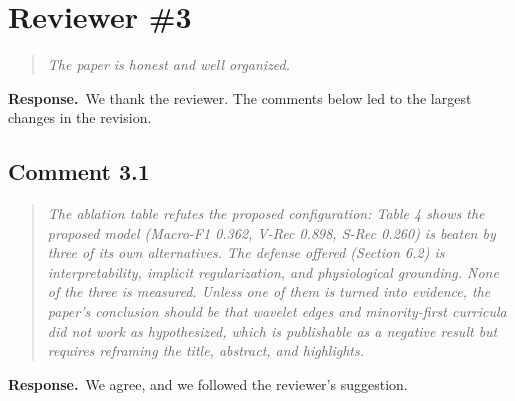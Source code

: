 \documentclass[11pt]{article}
\newenvironment{reviewer}{\begin{quote}\itshape\color{revcol}}{\end{quote}}
\newcommand{\resp}{\textbf{Response.}~}
\begin{document}
\section*{Reviewer \#3}

\begin{reviewer}
The paper is honest and well organized.
\end{reviewer}
\resp We thank the reviewer. The comments below led to the largest changes in the revision.

\subsection*{Comment 3.1}
\begin{reviewer}
The ablation table refutes the proposed configuration: Table 4 shows the proposed model (Macro-F1 0.362, V-Rec 0.898, S-Rec 0.260) is beaten by three of its own alternatives. The defense offered (Section 6.2) is interpretability, implicit regularization, and physiological grounding. None of the three is measured. Unless one of them is turned into evidence, the paper's conclusion should be that wavelet edges and minority-first curricula did not work as hypothesized, which is publishable as a negative result but requires reframing the title, abstract, and highlights.
\end{reviewer}
\resp We agree, and we followed the reviewer's suggestion.
\end{document}
